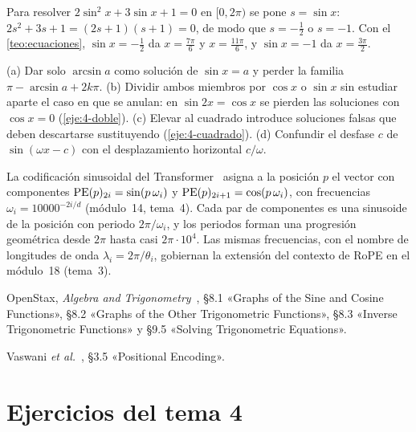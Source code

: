 \begin{ejemplo}\label{ej:cuadratica}
Para resolver $2\sin^{2}x+3\sin x+1=0$ en $[0,2\pi)$ se pone $s=\sin x$: $2s^{2}+3s+1=(2s+1)(s+1)=0$, de modo que $s=-\frac12$ o $s=-1$. Con el \cref{teo:ecuaciones}, $\sin x=-\frac12$ da $x=\frac{7\pi}{6}$ y $x=\frac{11\pi}{6}$, y $\sin x=-1$ da $x=\frac{3\pi}{2}$.
\end{ejemplo}

\begin{observacion}
(a) Dar solo $\arcsin a$ como solución de $\sin x=a$ y perder la familia $\pi-\arcsin a+2k\pi$. (b) Dividir ambos miembros por $\cos x$ o $\sin x$ sin estudiar aparte el caso en que se anulan: en $\sin2x=\cos x$ se pierden las soluciones con $\cos x=0$ (\cref{eje:4-doble}). (c) Elevar al cuadrado introduce soluciones falsas que deben descartarse sustituyendo (\cref{eje:4-cuadrado}). (d) Confundir el desfase $c$ de $\sin(\omega x-c)$ con el desplazamiento horizontal $c/\omega$.
\end{observacion}

\begin{observacion}
La codificación sinusoidal del Transformer~\cite[§3.5]{vaswani} asigna a la posición $p$ el vector con componentes $\operatorname{PE}(p)_{2i}=\sin(p\,\omega_i)$ y $\operatorname{PE}(p)_{2i+1}=\cos(p\,\omega_i)$, con frecuencias $\omega_i=10000^{-2i/d}$ (módulo~14, tema~4). Cada par de componentes es una sinusoide de la posición con periodo $2\pi/\omega_i$, y los periodos forman una progresión geométrica desde $2\pi$ hasta casi $2\pi\cdot10^{4}$. Las mismas frecuencias, con el nombre de longitudes de onda $\lambda_i=2\pi/\theta_i$, gobiernan la extensión del contexto de RoPE en el módulo~18 (tema~3).
\end{observacion}

\begin{lecturas}
\item OpenStax, \emph{Algebra and Trigonometry}~\cite{osat}, §8.1 «Graphs of the Sine and Cosine Functions», §8.2 «Graphs of the Other Trigonometric Functions», §8.3 «Inverse Trigonometric Functions» y §9.5 «Solving Trigonometric Equations».
\item Vaswani \emph{et al.}~\cite{vaswani}, §3.5 «Positional Encoding».
\end{lecturas}

\section*{Ejercicios del tema 4}

